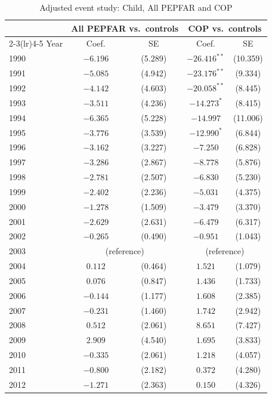 \begin{table}[htbp]
\centering
\small
\caption{Adjusted event study: Child, All PEPFAR and COP}
\label{tab:es_combined_mort_child}
\begin{tabular}{lcccc}
\toprule
 & \multicolumn{2}{c}{All PEPFAR vs.\ controls} & \multicolumn{2}{c}{COP vs.\ controls} \\
\cmidrule(lr){2-3}\cmidrule(lr){4-5}
Year & Coef. & SE & Coef. & SE \\
\midrule
1990 & $-6.196$ & (5.289) & $-26.416^{**}$ & (10.359) \\
1991 & $-5.085$ & (4.942) & $-23.176^{**}$ & (9.334) \\
1992 & $-4.142$ & (4.603) & $-20.058^{**}$ & (8.445) \\
1993 & $-3.511$ & (4.236) & $-14.273^{*}$ & (8.415) \\
1994 & $-6.365$ & (5.228) & $-14.997$ & (11.006) \\
1995 & $-3.776$ & (3.539) & $-12.990^{*}$ & (6.844) \\
1996 & $-3.162$ & (3.227) & $-7.250$ & (6.828) \\
1997 & $-3.286$ & (2.867) & $-8.778$ & (5.876) \\
1998 & $-2.781$ & (2.507) & $-6.830$ & (5.230) \\
1999 & $-2.402$ & (2.236) & $-5.031$ & (4.375) \\
2000 & $-1.278$ & (1.509) & $-3.479$ & (3.370) \\
2001 & $-2.629$ & (2.631) & $-6.479$ & (6.317) \\
2002 & $-0.265$ & (0.490) & $-0.951$ & (1.043) \\
2003 & \multicolumn{2}{c}{(reference)} & \multicolumn{2}{c}{(reference)} \\
2004 & $0.112$ & (0.464) & $1.521$ & (1.079) \\
2005 & $0.076$ & (0.847) & $1.436$ & (1.733) \\
2006 & $-0.144$ & (1.177) & $1.608$ & (2.385) \\
2007 & $-0.231$ & (1.460) & $1.742$ & (2.942) \\
2008 & $0.512$ & (2.061) & $8.651$ & (7.427) \\
2009 & $2.909$ & (4.540) & $1.695$ & (3.833) \\
2010 & $-0.335$ & (2.061) & $1.218$ & (4.057) \\
2011 & $-0.800$ & (2.182) & $0.372$ & (4.280) \\
2012 & $-1.271$ & (2.363) & $0.150$ & (4.326) \\

\end{tabular}
\end{table}
